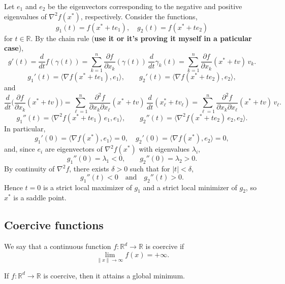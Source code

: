 \begin{answerenum}
    \item Let \(e_1\) and \(e_2\) be the eigenvectors corresponding to the negative and positive eigenvalues of \(\nabla^2 f(x^*)\), respectively. Consider the functions,
        \[ g_1(t) = f(x^* + te_1), \quad g_2(t) = f(x^* + te_2) \]
        for \(t \in \mathbb{R}\). By the chain rule (\textbf{use it or it's proving it myself in a paticular case}),
        $$ g'(t)=\frac{d}{dt}f(\gamma(t))
        =\sum_{k=1}^n \frac{\partial f}{\partial x_k}(\gamma(t))\,\frac{d}{dt}\gamma_k(t)
        =\sum_{k=1}^n \frac{\partial f}{\partial x_k}(x^*+tv)\,v_k. $$
        \[ g_1'(t) = \langle \nabla f(x^* + te_1), e_1 \rangle,\qquad g_2'(t) = \langle \nabla f(x^* + te_2), e_2 \rangle, \]
        and
        $$ \frac{d}{dt}\Big(\frac{\partial f}{\partial x_k}(x^*+tv)\Big)
        =\sum_{\ell=1}^n \frac{\partial^2 f}{\partial x_k\partial x_\ell}(x^*+tv)\,\frac{d}{dt}(x^*_\ell+t v_\ell)
        =\sum_{\ell=1}^n \frac{\partial^2 f}{\partial x_k\partial x_\ell}(x^*+tv)\, v_\ell . $$
        \[ g_1''(t) = \langle \nabla^2 f(x^* + te_1)\, e_1, e_1 \rangle,\qquad g_2''(t) = \langle \nabla^2 f(x^* + te_2)\, e_2, e_2 \rangle. \]
        In particular,
        \[ g_1'(0)=\langle \nabla f(x^*),e_1\rangle=0,\quad g_2'(0)=\langle \nabla f(x^*),e_2\rangle=0, \]
        and, since \(e_i\) are eigenvectors of \(\nabla^2 f(x^*)\) with eigenvalues \(\lambda_i\),
        \[ g_1''(0)=\lambda_1<0,\qquad g_2''(0)=\lambda_2>0. \]
        By continuity of \(\nabla^2 f\), there exists \(\delta>0\) such that for \(|t|<\delta\),
        \[ g_1''(t)<0 \quad\text{and}\quad g_2''(t)>0. \]
        Hence \(t=0\) is a strict local maximizer of \(g_1\) and a strict local minimizer of \(g_2\), so \(x^*\) is a saddle point.
\end{answerenum}

\subsection{Coercive functions}

\begin{definition}
    We say that a continuous function \(f: \mathbb{R}^d \to \mathbb{R}\) is coercive if
    \[ \lim_{\|x\| \to \infty} f(x) = +\infty. \] 
\end{definition}


\begin{proposition}
    If \(f: \mathbb{R}^d \to \mathbb{R}\) is coercive, then it attains a global minimum.
\end{proposition}

